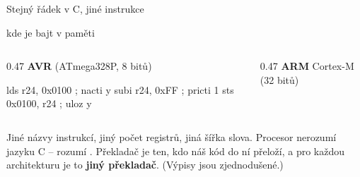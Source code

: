 \documentclass[12pt,aspectratio=169]{beamer}
\begin{document}
\begin{frame}[fragile]{Stejný řádek v C, jiné instrukce}
  \begin{center}
    \small {} \quad kde  je bajt v paměti
  \end{center}
  \vspace{-1mm}
  \begin{columns}[T]
    \begin{column}{0.47\textwidth}
      \centering \footnotesize \textbf{AVR} (ATmega328P, 8 bitů)
\begin{vystup}
lds  r24, 0x0100   ; nacti y
subi r24, 0xFF     ; pricti 1
sts  0x0100, r24   ; uloz y
\end{vystup}
    \end{column}
    \begin{column}{0.47\textwidth}
      \centering \footnotesize \textbf{ARM} Cortex-M (32 bitů)
    \end{column}
  \end{columns}
  \vspace{2mm}
  \footnotesize
  Jiné názvy instrukcí, jiný počet registrů, jiná šířka slova. Procesor
  nerozumí jazyku C -- rozumí . Překladač je ten,
  kdo náš kód do ní přeloží, a pro každou architekturu je to \textbf{jiný překladač}.
  (Výpisy jsou zjednodušené.)
\end{frame}
\end{document}
